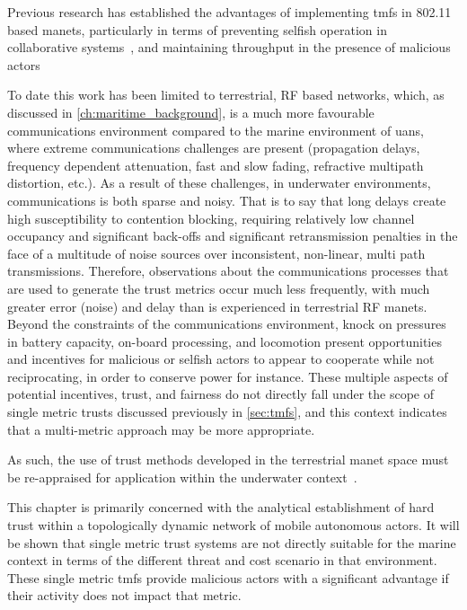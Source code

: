 Previous research has established the advantages of implementing \glspl{tmf} in 802.11 based \glspl{manet}, particularly in terms of preventing selfish operation in collaborative systems~\cite{Li2007}, and maintaining throughput in the presence of malicious actors~\cite{Buchegger2002}

To date this work has been limited to terrestrial, RF based networks, which, as discussed in \autoref{ch:maritime_background}, is a much more favourable communications environment compared to the marine environment of \glspl{uan}, where extreme communications challenges are present (propagation delays, frequency dependent attenuation, fast and slow fading, refractive multipath distortion, etc.).
As a result of these challenges, in underwater environments, communications is both sparse and noisy.
That is to say that long delays create high susceptibility to contention blocking, requiring relatively low channel occupancy and significant back-offs and significant retransmission penalties in the face of a multitude of noise sources over inconsistent, non-linear, multi path transmissions.
Therefore, observations about the communications processes that are used to generate the trust metrics occur much less frequently, with much greater error (noise) and delay than is experienced in terrestrial RF \glspl{manet}.
Beyond the constraints of the communications environment, knock on pressures in battery capacity, on-board processing, and locomotion present opportunities and incentives for malicious or selfish actors to appear to cooperate while not reciprocating, in order to conserve power for instance.
These multiple aspects of potential incentives, trust, and fairness do not directly fall under the scope of single metric trusts discussed previously in \autoref{sec:tmfs}, and this context indicates that a multi-metric approach may be more appropriate.

As such, the use of trust methods developed in the terrestrial \gls{manet} space must be re-appraised for application within the underwater context~\cite{Pavan2015}.

This chapter is primarily concerned with the analytical establishment of hard trust within a topologically dynamic network of mobile autonomous actors.
It will be shown that single metric trust systems are not directly suitable for the marine context in terms of the different threat and cost scenario in that environment.
These single metric \glspl{tmf} provide malicious actors with a significant advantage if their activity does not impact that metric.


